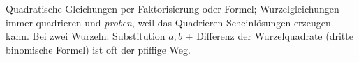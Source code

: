 \begin{merksatz}
Quadratische Gleichungen per Faktorisierung oder Formel; Wurzelgleichungen
immer quadrieren und \emph{proben}, weil das Quadrieren Scheinlösungen
erzeugen kann. Bei zwei Wurzeln: Substitution $a,b$ + Differenz der
Wurzelquadrate (dritte binomische Formel) ist oft der pfiffige Weg.
\end{merksatz}
